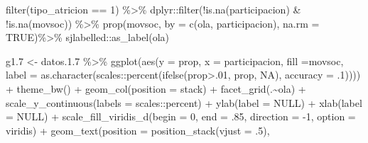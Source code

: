 \documentclass[
  12pt,
]{book}
\newenvironment{Shaded}{\begin{snugshade}}{\end{snugshade}}
\newcommand{\AttributeTok}[1]{\textcolor[rgb]{0.77,0.63,0.00}{#1}}
\newcommand{\ConstantTok}[1]{\textcolor[rgb]{0.00,0.00,0.00}{#1}}
\newcommand{\DecValTok}[1]{\textcolor[rgb]{0.00,0.00,0.81}{#1}}
\newcommand{\FloatTok}[1]{\textcolor[rgb]{0.00,0.00,0.81}{#1}}
\newcommand{\FunctionTok}[1]{\textcolor[rgb]{0.00,0.00,0.00}{#1}}
\newcommand{\NormalTok}[1]{#1}
\newcommand{\OtherTok}[1]{\textcolor[rgb]{0.56,0.35,0.01}{#1}}
\newcommand{\SpecialCharTok}[1]{\textcolor[rgb]{0.00,0.00,0.00}{#1}}
\newcommand{\StringTok}[1]{\textcolor[rgb]{0.31,0.60,0.02}{#1}}
\begin{document}
\begin{Shaded}
\begin{Highlighting}[]
    \FunctionTok{filter}\NormalTok{(tipo\_atricion }\SpecialCharTok{==} \DecValTok{1}\NormalTok{) }\SpecialCharTok{\%\textgreater{}\%}
\NormalTok{    dplyr}\SpecialCharTok{::}\FunctionTok{filter}\NormalTok{(}\SpecialCharTok{!}\FunctionTok{is.na}\NormalTok{(participacion) }\SpecialCharTok{\&} \SpecialCharTok{!}\FunctionTok{is.na}\NormalTok{(movsoc)) }\SpecialCharTok{\%\textgreater{}\%}
  \FunctionTok{prop}\NormalTok{(movsoc, }\AttributeTok{by  =} \FunctionTok{c}\NormalTok{(ola, participacion), }\AttributeTok{na.rm =} \ConstantTok{TRUE}\NormalTok{)}\SpecialCharTok{\%\textgreater{}\%} 
\NormalTok{  sjlabelled}\SpecialCharTok{::}\FunctionTok{as\_label}\NormalTok{(ola)}

\NormalTok{g1}\FloatTok{.7} \OtherTok{\textless{}{-}}\NormalTok{ datos.}\FloatTok{1.7} \SpecialCharTok{\%\textgreater{}\%} 
  \FunctionTok{ggplot}\NormalTok{(}\FunctionTok{aes}\NormalTok{(}\AttributeTok{y =}\NormalTok{ prop, }\AttributeTok{x =}\NormalTok{ participacion, }\AttributeTok{fill =}\NormalTok{movsoc, }
             \AttributeTok{label =} \FunctionTok{as.character}\NormalTok{(scales}\SpecialCharTok{::}\FunctionTok{percent}\NormalTok{(}\FunctionTok{ifelse}\NormalTok{(prop}\SpecialCharTok{\textgreater{}}\NormalTok{.}\DecValTok{01}\NormalTok{, prop, }\ConstantTok{NA}\NormalTok{), }\AttributeTok{accuracy =}\NormalTok{ .}\DecValTok{1}\NormalTok{)))) }\SpecialCharTok{+}
  \FunctionTok{theme\_bw}\NormalTok{() }\SpecialCharTok{+}
  \FunctionTok{geom\_col}\NormalTok{(}\AttributeTok{position =} \StringTok{\textquotesingle{}stack\textquotesingle{}}\NormalTok{) }\SpecialCharTok{+}
  \FunctionTok{facet\_grid}\NormalTok{(.}\SpecialCharTok{\textasciitilde{}}\NormalTok{ola) }\SpecialCharTok{+}
  \FunctionTok{scale\_y\_continuous}\NormalTok{(}\AttributeTok{labels =}\NormalTok{ scales}\SpecialCharTok{::}\NormalTok{percent) }\SpecialCharTok{+}
  \FunctionTok{ylab}\NormalTok{(}\AttributeTok{label =} \ConstantTok{NULL}\NormalTok{) }\SpecialCharTok{+}
  \FunctionTok{xlab}\NormalTok{(}\AttributeTok{label =} \ConstantTok{NULL}\NormalTok{) }\SpecialCharTok{+}
  \FunctionTok{scale\_fill\_viridis\_d}\NormalTok{(}\AttributeTok{begin =} \DecValTok{0}\NormalTok{, }\AttributeTok{end =}\NormalTok{ .}\DecValTok{85}\NormalTok{, }\AttributeTok{direction =} \SpecialCharTok{{-}}\DecValTok{1}\NormalTok{, }\AttributeTok{option =} \StringTok{\textquotesingle{}viridis\textquotesingle{}}\NormalTok{) }\SpecialCharTok{+}
  \FunctionTok{geom\_text}\NormalTok{(}\AttributeTok{position =} \FunctionTok{position\_stack}\NormalTok{(}\AttributeTok{vjust =}\NormalTok{ .}\DecValTok{5}\NormalTok{),}

\end{Highlighting}
\end{Shaded}
\end{document}
